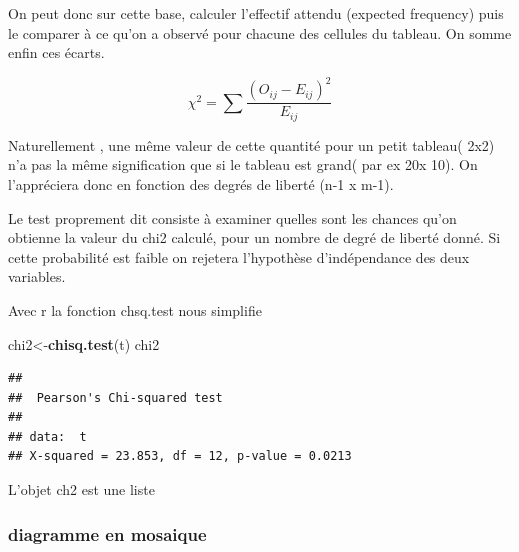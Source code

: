 \documentclass[
]{book}
\newenvironment{Shaded}{\begin{snugshade}}{\end{snugshade}}
\newcommand{\CommentTok}[1]{\textcolor[rgb]{0.56,0.35,0.01}{\textit{#1}}}
\newcommand{\DataTypeTok}[1]{\textcolor[rgb]{0.13,0.29,0.53}{#1}}
\newcommand{\DecValTok}[1]{\textcolor[rgb]{0.00,0.00,0.81}{#1}}
\newcommand{\KeywordTok}[1]{\textcolor[rgb]{0.13,0.29,0.53}{\textbf{#1}}}
\newcommand{\NormalTok}[1]{#1}
\newcommand{\OperatorTok}[1]{\textcolor[rgb]{0.81,0.36,0.00}{\textbf{#1}}}
\begin{document}
On peut donc sur cette base, calculer l'effectif attendu (expected frequency) puis le comparer à ce qu'on a observé pour chacune des cellules du tableau. On somme enfin ces écarts.

\[\chi^2 = \sum \frac {(O_{ij} - E_{ij})^2}{E_{ij}}\]

Naturellement , une même valeur de cette quantité pour un petit tableau( 2x2) n'a pas la même signification que si le tableau est grand( par ex 20x 10). On l'appréciera donc en fonction des degrés de liberté (n-1 x m-1).

Le test proprement dit consiste à examiner quelles sont les chances qu'on obtienne la valeur du chi2 calculé, pour un nombre de degré de liberté donné. Si cette probabilité est faible on rejetera l'hypothèse d'indépendance des deux variables.

Avec r la fonction chsq.test nous simplifie

\begin{Shaded}
\begin{Highlighting}[]
\NormalTok{chi2<-}\KeywordTok{chisq.test}\NormalTok{(t)}
\NormalTok{chi2}
\end{Highlighting}
\end{Shaded}

\begin{verbatim}
## 
##  Pearson's Chi-squared test
## 
## data:  t
## X-squared = 23.853, df = 12, p-value = 0.0213
\end{verbatim}

L'objet ch2 est une liste

\begin{Shaded}
\end{Shaded}

\hypertarget{diagramme-en-mosaique}{%
\subsubsection{diagramme en mosaique}\label{diagramme-en-mosaique}}
\end{document}
